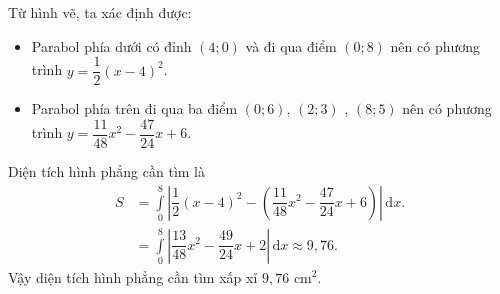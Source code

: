 \begin{ex}
{	Từ hình vẽ, ta xác định được:
	\begin{itemize}
		\item Parabol phía dưới có đỉnh $(4;0)$ và đi qua điểm $(0;8)$ nên có phương trình $y=\dfrac{1}{2}(x-4)^2$.
		\item Parabol phía trên đi qua ba điểm $(0;6)$, $(2;3)$ , $(8;5)$ nên có phương trình $y=\dfrac{11}{48}x^2-\dfrac{47}{24}x+6$.
	\end{itemize}
	Diện tích hình phẳng cần tìm là 
	\begin{align*}
		S& =\displaystyle \int\limits_0^8 \left|\dfrac12(x-4)^2-\left(\dfrac{11}{48}x^2-\dfrac{47}{24}x+6\right)\right|\mathrm{\,d}x.\\
		&=\int\limits_0^8\left|\dfrac{13}{48}x^2-\dfrac{49}{24}x+2\right|\mathrm{\,d}x\approx 9{,}76.
	\end{align*}
	Vậy diện tích hình phẳng cần tìm xấp xỉ $9{,}76\text{ cm}^2$.
	}
\end{ex}

